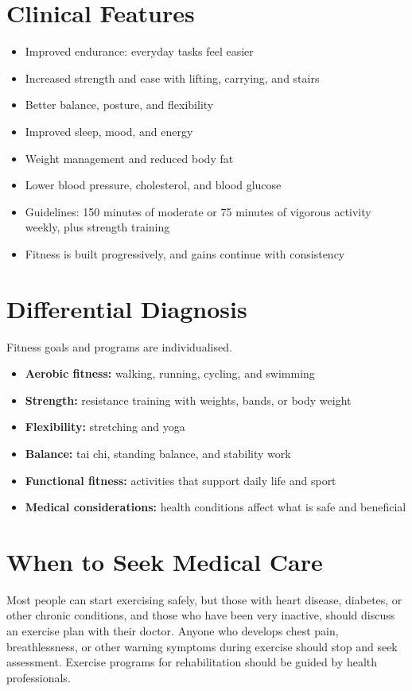 \section*{Clinical Features}
\begin{itemize}
    \item Improved endurance: everyday tasks feel easier
    \item Increased strength and ease with lifting, carrying, and stairs
    \item Better balance, posture, and flexibility
    \item Improved sleep, mood, and energy
    \item Weight management and reduced body fat
    \item Lower blood pressure, cholesterol, and blood glucose
    \item Guidelines: 150 minutes of moderate or 75 minutes of vigorous activity weekly, plus strength training
    \item Fitness is built progressively, and gains continue with consistency
\end{itemize}

\section*{Differential Diagnosis}
Fitness goals and programs are individualised.
\begin{itemize}
    \item \textbf{Aerobic fitness:} walking, running, cycling, and swimming
    \item \textbf{Strength:} resistance training with weights, bands, or body weight
    \item \textbf{Flexibility:} stretching and yoga
    \item \textbf{Balance:} tai chi, standing balance, and stability work
    \item \textbf{Functional fitness:} activities that support daily life and sport
    \item \textbf{Medical considerations:} health conditions affect what is safe and beneficial
\end{itemize}

\section*{When to Seek Medical Care}
Most people can start exercising safely, but those with heart disease, diabetes, or other chronic conditions, and those who have been very inactive, should discuss an exercise plan with their doctor. Anyone who develops chest pain, breathlessness, or other warning symptoms during exercise should stop and seek assessment. Exercise programs for rehabilitation should be guided by health professionals.


